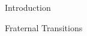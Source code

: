 \begin{block}{Introduction}

\begin{alertblock}{Fraternal Transitions}

\end{alertblock}

\end{block}
